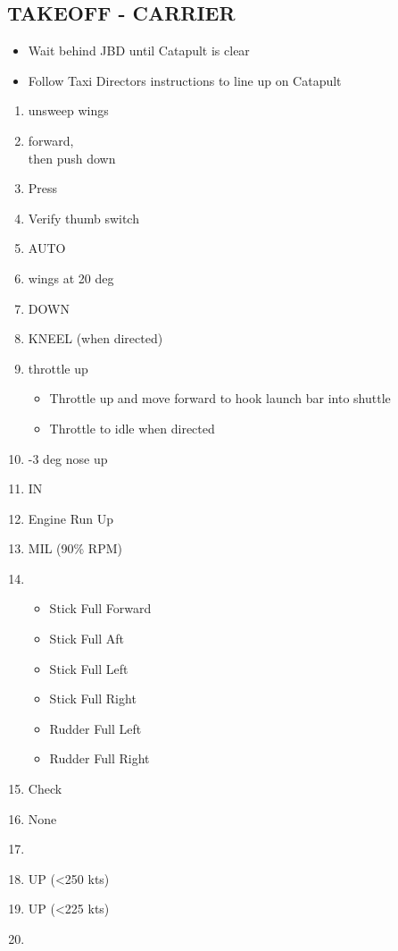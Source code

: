 \documentclass[8pt,usenames,dvipsnames,twoside]{article}
\begin{document}
\begin{multicols*}{2}
		\subsection{TAKEOFF - CARRIER}
		\begin{itemize}
			
			
			\item Wait behind JBD until Catapult is clear
			\item Follow Taxi Directors instructions to line up on Catapult
		\end{itemize}
		\begin{enumerate}
			\item {} \dotfill unsweep wings
			\item {} \dotfill forward,\\
			\hfill then push down
			\item {} \dotfill Press
			\item {} \dotfill Verify thumb switch
			\item {} \dotfill AUTO
			\item {} \dotfill wings at 20 deg
			\item {} \dotfill DOWN
			\item {} \dotfill KNEEL (when directed)  
			\item {} \dotfill throttle up
			\begin{itemize}
				\item Throttle up and move forward to hook launch bar into shuttle
				\item Throttle to idle when directed
			\end{itemize}
			\item {} -3 deg nose up
			\item {} \dotfill IN
			\item {} \dotfill Engine Run Up
			\item {} \dotfill MIL (90\% RPM) 
			\item {}
			\begin{itemize}
				\item Stick Full Forward
				\item Stick Full Aft
				\item Stick Full Left
				\item Stick Full Right
				\item Rudder Full Left
				\item Rudder Full Right
			\end{itemize}
			\item {} \dotfill Check
			\item {} \dotfill None
			\item {}
			\item {} \dotfill UP (<250 kts)
			\item {} \dotfill UP (<225 kts)
			\item {}
		\end{enumerate}
		

\end{multicols*}
\end{document}
